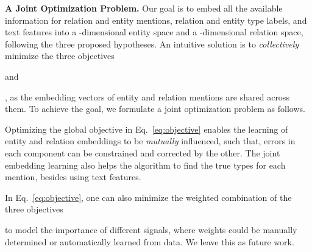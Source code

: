\documentclass[letterpaper]{sig-alternate-2013}
\begin{document}
\medskip\noindent
\textsf{\small\textbf{A Joint Optimization Problem.}}
Our goal is to embed all the available information for relation and entity mentions, relation and entity type labels, and text features into a -dimensional entity space and a -dimensional relation  space, following the three proposed hypotheses. An intuitive solution is to \textit{collectively} minimize the three objectives \begin{small}\end{small} \begin{small}\end{small} and \begin{small}\end{small}, as the embedding vectors of entity and relation mentions are shared across them. To achieve the goal, we formulate a joint optimization problem as follows.



Optimizing the global objective  in Eq.~\eqref{eq:objective} enables the learning of entity and relation embeddings to be \textit{mutually} influenced, such that, errors in each component can be constrained and corrected by the other. The joint embedding learning also helps the algorithm to find the true types for each mention, besides using text features.

In Eq.~\eqref{eq:objective}, one can also minimize the weighted combination of the three objectives \begin{small}\end{small} to model the importance of different signals, where weights could be  manually determined or automatically learned from data. We leave this as future work. 
\end{document}
